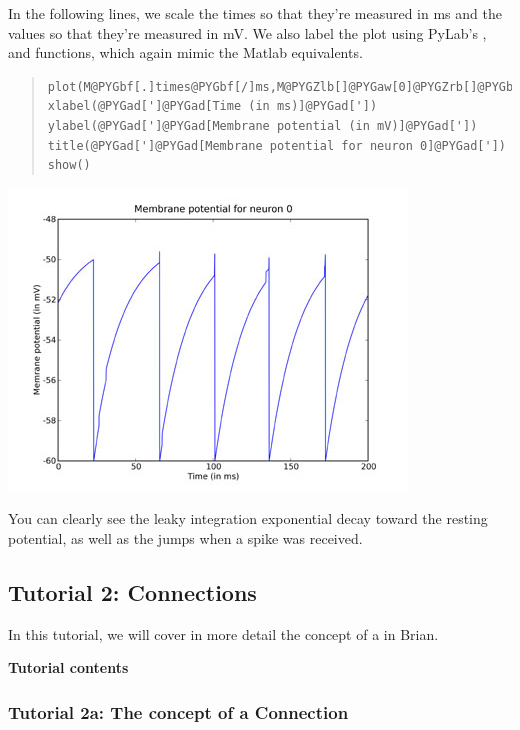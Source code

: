 \documentclass[letterpaper,10pt,english]{manual}
\begin{document}
In the following lines, we scale the times so that they're
measured in ms and the values so that they're measured in
mV. We also label the plot using PyLab's ,  and
 functions, which again mimic the Matlab equivalents.
\begin{quote}

\begin{Verbatim}[commandchars=@\[\]]
plot(M@PYGbf[.]times@PYGbf[/]ms,M@PYGZlb[]@PYGaw[0]@PYGZrb[]@PYGbf[/]mV)
xlabel(@PYGad[']@PYGad[Time (in ms)]@PYGad['])
ylabel(@PYGad[']@PYGad[Membrane potential (in mV)]@PYGad['])
title(@PYGad[']@PYGad[Membrane potential for neuron 0]@PYGad['])
show()
\end{Verbatim}
\end{quote}

\includegraphics{1g.jpg}

You can clearly see the leaky integration exponential decay
toward the resting potential, as well as the jumps when a
spike was received.

\resetcurrentobjects
\hypertarget{--doc-tutorial2_connections}{}

\hypertarget{tutorial2-connections}{}\subsection{Tutorial 2: Connections}

In this tutorial, we will cover in more detail the concept of a \hyperlink{brian.Connection}{}
in Brian.

\textbf{Tutorial contents}

\resetcurrentobjects
\hypertarget{--doc-tutorial_2a_the_concept_of_a_connection}{}

\subsubsection{Tutorial 2a: The concept of a Connection}
\end{document}
